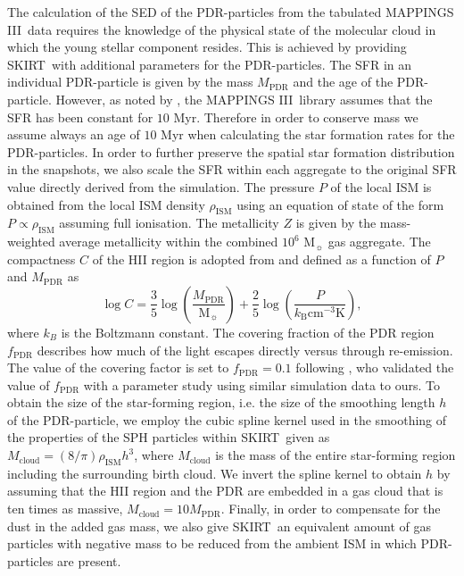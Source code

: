 \documentclass[a4paper,fleqn,usenatbib]{mnras}
\newcommand{\mappings}{\textsc{MAPPINGS III}}
\newcommand{\skirt}{\textsc{SKIRT}}
\begin{document}
The calculation of the SED of the PDR-particles from the tabulated \mappings\ data requires 
the knowledge of the physical state of the molecular cloud in which the young stellar component 
resides. This is achieved by providing \skirt\ with additional parameters for the PDR-particles.
The SFR in an individual PDR-particle is given by the mass $M_\mathrm{PDR}$ 
and the age of the PDR-particle. However, as noted by \citet{2017MNRAS.470..771T}, 
the \mappings\ library assumes that the SFR has been constant for $10$ Myr. Therefore
in order to conserve mass we assume always an age of $10$ Myr when calculating the star formation rates for the PDR-particles.
In order to further preserve the spatial star formation distribution in the snapshots, we also scale the SFR within each aggregate to 
the original SFR value directly derived from the simulation.
The pressure $P$ of the local ISM is obtained from 
the local ISM density $\rho_\mathrm{ISM}$ using an equation of state of the form 
$P\propto \rho_\mathrm{ISM}$ assuming full ionisation. The 
metallicity $Z$ is given by the mass-weighted average metallicity within the combined $10^6$ M$_{\sun}$ gas aggregate.
The compactness $C$ of the HII region is adopted from \citet{2008ApJS..176..438G} and defined as a function of $P$ and $M_\mathrm{PDR}$  
as
\begin{equation}
 \log{C} = 
\frac{3}{5}\log{\left(\frac{M_\mathrm{PDR}}{\mathrm{M}_{\sun}}\right)}+\frac{2}{5}\log{
\left(\frac{P}{k_\mathrm{B } \mathrm{cm^{-3}K}}\right)},
\end{equation}
where $k_B$ is the Boltzmann constant.
The covering fraction of the PDR region $f_\mathrm{PDR}$ 
describes how much of the light escapes directly versus through re-emission. 
The value of the covering factor is set to $f_\mathrm{PDR}=0.1$ following \citet{2016MNRAS.462.1057C},
who validated the value of $f_\mathrm{PDR}$ with a parameter study using similar simulation data to ours.
To obtain the size of the star-forming region, i.e. the size of the smoothing length $h$ of the PDR-particle, 
we employ the cubic spline kernel used in the smoothing of
the properties of the SPH particles within \skirt\ given as 
$M_{\mathrm{cloud}}=(8/\pi) \rho_\mathrm{ISM} h^3$, where $M_{\mathrm{cloud}}$ is the mass of the entire
star-forming region including the surrounding birth cloud.
We invert the
spline kernel to obtain $h$ by assuming that the HII region and the PDR are 
embedded in a gas cloud that is ten times as massive, $M_{\mathrm{cloud}}=10M_{\mathrm{PDR}}$. 
Finally, in order to compensate for the dust in the added gas mass, we also give
\skirt\ an equivalent amount of gas particles with negative mass to be reduced
from the ambient ISM in which PDR-particles are present.
\end{document}
